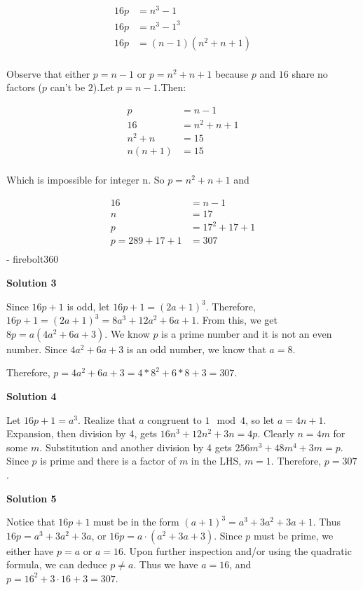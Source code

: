 \begin{enumerate}
 
 \begin{align*} 16p &= n^3-1\\ 16p &= n^3-1^3\\ 16p &= (n-1)(n^2+n+1)\\ \end{align*}


 Observe that either $p=n-1$ or $p=n^2+n+1$ because $p$ and $16$ share no factors ($p$ can't be $2$).Let $p=n-1$.Then:

 
 \begin{align*} p &= n-1\\ 16 &= n^2+n+1\\ n^2+n &= 15\\ n(n+1) &= 15\\ \end{align*}


 Which is impossible for integer n. So $p=n^2+n+1$ and

 
 \begin{align*} 16 &= n-1\\ n &= 17\\ p &= 17^2+17+1\\ p = 289+17+1 &= \boxed{307}\\ \end{align*}
 - firebolt360

 



\textbf{Solution 3}

Since $16p+1$ is odd, let $16p+1 = (2a+1)^3$. Therefore, $16p+1 = (2a+1)^3 = 8a^3+12a^2+6a+1$. From this, we get $8p=a(4a^2+6a+3)$. We know $p$ is a prime number and it is not an even number. Since $4a^2+6a+3$ is an odd number, we know that $a=8$.

 Therefore, $p=4a^2+6a+3=4*8^2+6*8+3=\boxed{307}$.

 



\textbf{Solution 4}

Let $16p+1=a^3$. Realize that $a$ congruent to $1\mod 4$, so let $a=4n+1$. Expansion, then division by 4, gets $16n^3+12n^2+3n=4p$. Clearly $n=4m$ for some $m$. Substitution and another division by 4 gets $256m^3+48m^4+3m=p$. Since $p$ is prime and there is a factor of $m$ in the LHS, $m=1$. Therefore, $p=\boxed{307}$.

 



\textbf{Solution 5}

Notice that $16p+1$ must be in the form $(a+1)^3 = a^3 + 3a^2 + 3a + 1$. Thus $16p = a^3 + 3a^2 + 3a$, or $16p = a\cdot (a^2 + 3a + 3)$. Since $p$ must be prime, we either have $p = a$ or $a = 16$. Upon further inspection and/or using the quadratic formula, we can deduce $p \neq a$. Thus we have $a = 16$, and $p = 16^2 + 3\cdot 16 + 3 = \boxed{307}$.


\end{enumerate}
